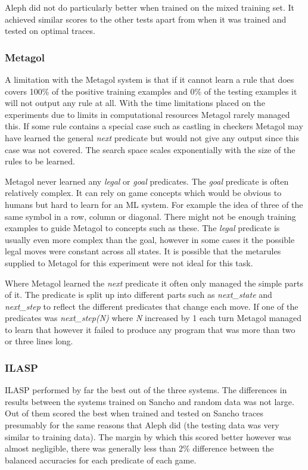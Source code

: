 Aleph did not do particularly better when trained on the mixed training set. It achieved similar scores to the other tests apart from when it was trained and tested on optimal traces.

\subsubsection{Metagol}
A limitation with the Metagol system is that if it cannot learn a rule that does covers 100\% of the positive training examples and 0\% of the testing examples it will not output any rule at all. With the time limitations placed on the experiments due to limits in computational resources Metagol rarely managed this. If some rule contains a special case such as castling in checkers Metagol may have learned the general \textit{next} predicate but would not give any output since this case was not covered. The search space scales exponentially with the size of the rules to be learned.

Metagol never learned any \textit{legal} or \textit{goal} predicates. The \textit{goal} predicate is often relatively complex. It can rely on game concepts which would be obvious to humans but hard to learn for an ML system. For example the idea of three of the same symbol in a row, column or diagonal. There might not be enough training examples to guide Metagol to concepts such as these. The \textit{legal} predicate is usually even more complex than the goal, however in some cases it the possible legal moves were constant across all states. It is possible that the metarules supplied to Metagol for this experiment were not ideal for this task.

Where Metagol learned the \textit{next} predicate it often only managed the simple parts of it. The predicate is split up into different parts such as \textit{next\_state} and \textit{next\_step} to reflect the different predicates that change each move. If one of the predicates was \textit{next\_step(N)} where \textit{N} increased by 1 each turn Metagol managed to learn that however it failed to produce any program that was more than two or three lines long.

\subsubsection{ILASP}
ILASP performed by far the best out of the three systems. The differences in results between the systems trained on Sancho and random data was not large. Out of them scored the best when trained and tested on Sancho traces presumably for the same reasons that Aleph did (the testing data was very similar to training data). The margin by which this scored better however was almost negligible, there was generally less than 2\% difference between the balanced accuracies for each predicate of each game.

